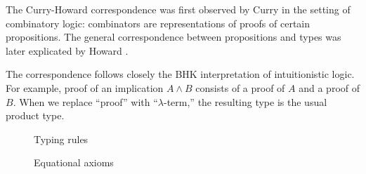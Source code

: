 \documentclass[a4paper]{article}
\begin{document}
The Curry-Howard correspondence was first observed by Curry \cite{Curry58} in the setting of combinatory logic: combinators are representations of proofs of certain propositions.
The general correspondence between propositions and types was later explicated by Howard \cite{Howard80}.

The correspondence follows closely the BHK interpretation of intuitionistic logic.
For example, proof of an implication $A \wedge B$ consists of a proof of $A$ and a proof of $B$.
When we replace ``proof'' with ``$\lambda$-term,'' the resulting type is the usual product type.

\begin{figure}
  \centering
  \caption{Typing rules}
  \label{fig:0000}
\end{figure}

\begin{figure}
  \centering
  \caption{Equational axioms}
  \label{fig:0001}
\end{figure}
\end{document}
